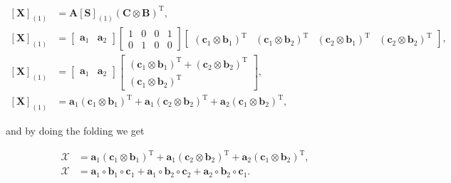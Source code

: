 \documentclass[a4paper,10pt]{article}
\begin{document}
\begin{enumerate}
        \begin{align}
            \left[\boldsymbol{X}\right]_{(1)} &= \boldsymbol{A} \left[\boldsymbol{S}\right]_{(1)} (\boldsymbol{C} \otimes \boldsymbol{B})^{\text{T}}, \\
            \left[\boldsymbol{X}\right]_{(1)} &= 
            \begin{bmatrix}
                \boldsymbol{a}_{1} & \boldsymbol{a}_{2}
            \end{bmatrix}
            \begin{bmatrix}
                1 & 0 & 0 & 1 \\
                0 & 1 & 0 & 0
            \end{bmatrix} 
            \begin{bmatrix}
                (\boldsymbol{c}_{1} \otimes \boldsymbol{b}_{1})^{\text{T}} & (\boldsymbol{c}_{1} \otimes \boldsymbol{b}_{2})^{\text{T}} & (\boldsymbol{c}_{2} \otimes \boldsymbol{b}_{1})^{\text{T}} & (\boldsymbol{c}_{2} \otimes \boldsymbol{b}_{2})^{\text{T}}
            \end{bmatrix}, \\
            \left[\boldsymbol{X}\right]_{(1)} &= 
            \begin{bmatrix}
                \boldsymbol{a}_{1} & \boldsymbol{a}_{2}
            \end{bmatrix}
            \begin{bmatrix}
                (\boldsymbol{c}_{1} \otimes \boldsymbol{b}_{1})^{\text{T}} + (\boldsymbol{c}_{2} \otimes \boldsymbol{b}_{2})^{\text{T}} \\
                (\boldsymbol{c}_{1} \otimes \boldsymbol{b}_{2})^{\text{T}}
            \end{bmatrix}, \\
            \left[\boldsymbol{X}\right]_{(1)} &= \boldsymbol{a}_{1} (\boldsymbol{c}_{1} \otimes \boldsymbol{b}_{1})^{\text{T}} + \boldsymbol{a}_{1} (\boldsymbol{c}_{2} \otimes \boldsymbol{b}_{2})^{\text{T}} + \boldsymbol{a}_{2} (\boldsymbol{c}_{1} \otimes \boldsymbol{b}_{2})^{\text{T}},
        \end{align}

        and by doing the folding we get

        \begin{align}
            \mathcal{X} &= \boldsymbol{a}_{1} (\boldsymbol{c}_{1} \otimes \boldsymbol{b}_{1})^{\text{T}} + \boldsymbol{a}_{1} (\boldsymbol{c}_{2} \otimes \boldsymbol{b}_{2})^{\text{T}} + \boldsymbol{a}_{2} (\boldsymbol{c}_{1} \otimes \boldsymbol{b}_{2})^{\text{T}}, \\
            \mathcal{X} &= \boldsymbol{a}_{1} \circ \boldsymbol{b}_{1} \circ \boldsymbol{c}_{1} + \boldsymbol{a}_{1} \circ \boldsymbol{b}_{2} \circ \boldsymbol{c}_{2} + \boldsymbol{a}_{2} \circ \boldsymbol{b}_{2} \circ \boldsymbol{c}_{1}.
        \end{align}


\end{enumerate}
\end{document}
